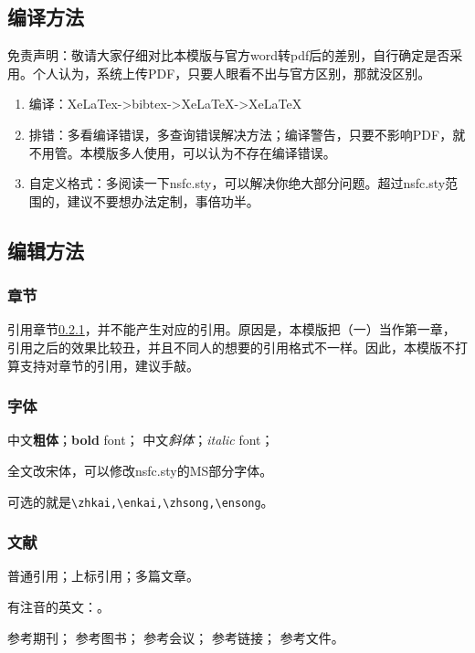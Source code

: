 

\subsection{编译方法}
免责声明：敬请大家仔细对比本模版与官方word转pdf后的差别，自行确定是否采用。个人认为，系统上传PDF，只要人眼看不出与官方区别，那就没区别。

\begin{enumerate}
	\item 编译：XeLaTex->bibtex->XeLaTeX->XeLaTeX
	\item 排错：多看编译错误，多查询错误解决方法；编译警告，只要不影响PDF，就不用管。本模版多人使用，可以认为不存在编译错误。
	\item 自定义格式：多阅读一下nsfc.sty，可以解决你绝大部分问题。超过nsfc.sty范围的，建议不要想办法定制，事倍功半。
\end{enumerate}


\subsection{编辑方法}
\vspace{-5pt}

\subsubsection{章节}\label{sec:t}
引用章节\ref{sec:t}，并不能产生对应的引用。原因是，本模版把（一）当作第一章，引用之后的效果比较丑，并且不同人的想要的引用格式不一样。因此，本模版不打算支持对章节的引用，建议手敲。

\subsubsection{字体}
中文\textbf{粗体}；\textbf{bold} font；
中文\textit{斜体}；\textit{italic} font；

全文改宋体，可以修改nsfc.sty的MS部分字体。

可选的就是\verb|\zhkai,\enkai,\zhsong,\ensong|。

\subsubsection{文献}
普通引用\cite{test}；上标引用；多篇文章。

有注音的英文：\cite{test}。

参考期刊\cite{test}；
参考图书\cite{test2}；
参考会议\cite{test5}；
参考链接\cite{test4}；
参考文件\cite{test6}。


